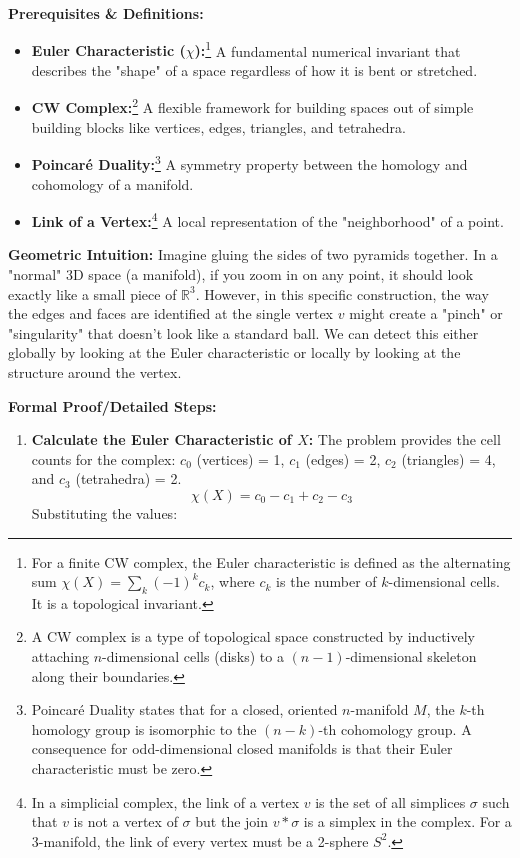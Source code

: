 \begin{solution}
\textbf{Prerequisites \& Definitions:}
\begin{itemize}
    \item \textbf{Euler Characteristic ($\chi$):}\footnote{For a finite CW complex, the Euler characteristic is defined as the alternating sum $\chi(X) = \sum_{k} (-1)^k c_k$, where $c_k$ is the number of $k$-dimensional cells. It is a topological invariant.} A fundamental numerical invariant that describes the "shape" of a space regardless of how it is bent or stretched.
    \item \textbf{CW Complex:}\footnote{A CW complex is a type of topological space constructed by inductively attaching $n$-dimensional cells (disks) to a $(n-1)$-dimensional skeleton along their boundaries.} A flexible framework for building spaces out of simple building blocks like vertices, edges, triangles, and tetrahedra.
    \item \textbf{Poincaré Duality:}\footnote{Poincaré Duality states that for a closed, oriented $n$-manifold $M$, the $k$-th homology group is isomorphic to the $(n-k)$-th cohomology group. A consequence for odd-dimensional closed manifolds is that their Euler characteristic must be zero.} A symmetry property between the homology and cohomology of a manifold.
    \item \textbf{Link of a Vertex:}\footnote{In a simplicial complex, the link of a vertex $v$ is the set of all simplices $\sigma$ such that $v$ is not a vertex of $\sigma$ but the join $v * \sigma$ is a simplex in the complex. For a 3-manifold, the link of every vertex must be a 2-sphere $S^2$.} A local representation of the "neighborhood" of a point.
\end{itemize}

\textbf{Geometric Intuition:}
Imagine gluing the sides of two pyramids together. In a "normal" 3D space (a manifold), if you zoom in on any point, it should look exactly like a small piece of $\mathbb{R}^3$. However, in this specific construction, the way the edges and faces are identified at the single vertex $v$ might create a "pinch" or "singularity" that doesn't look like a standard ball. We can detect this either globally by looking at the Euler characteristic or locally by looking at the structure around the vertex.

\textbf{Formal Proof/Detailed Steps:}
\begin{enumerate}
    \item \textbf{Calculate the Euler Characteristic of $X$:}
    The problem provides the cell counts for the complex: $c_0$ (vertices) = 1, $c_1$ (edges) = 2, $c_2$ (triangles) = 4, and $c_3$ (tetrahedra) = 2.
    \[ \chi(X) = c_0 - c_1 + c_2 - c_3 \]
    Substituting the values:
    

\end{enumerate}
\end{solution}
